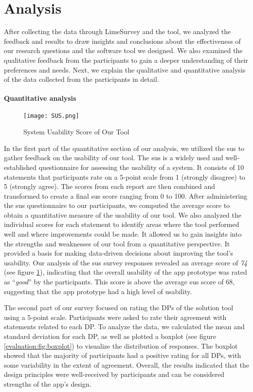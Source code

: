 \clearpage
\section{Analysis}
\label{evaluation:section:analysis}
After collecting the data through LimeSurvey and the tool, we analyzed the feedback and results to draw insights and conclusions about the effectiveness of our research questions and the software tool we designed. 
We also examined the qualitative feedback from the participants to gain a deeper understanding of their preferences and needs. 
Next, we explain the qualitative and quantitative analysis of the data collected from the participants in detail.

\paragraph{Quantitative analysis}
\begin{figure}[ht]
    \centering
    \texttt{[image: SUS.png]}
    \caption{System Usability Score of Our Tool}
    \label{evaluation:fig:sus}
\end{figure}
In the first part of the quantitative section of our analysis, we utilized the \ac{sus} to gather feedback on the usability of our tool. 
The \ac{sus} is a widely used and well-established questionnaire for assessing the usability of a system. 
It consists of 10 statements that participants rate on a 5-point scale from 1 (strongly disagree) to 5 (strongly agree). 
The scores from each report are then combined and transformed to create a final \ac{sus} score ranging from 0 to 100.
After administering the \ac{sus} questionnaire to our participants, we computed the average score to obtain a quantitative measure of the usability of our tool. 
We also analyzed the individual scores for each statement to identify areas where the tool performed well and where improvements could be made. 
It allowed us to gain insights into the strengths and weaknesses of our tool from a quantitative perspective. 
It provided a basis for making data-driven decisions about improving the tool's usability. 
Our analysis of the \ac{sus} survey responses revealed an average score of \textit{74} (see figure \ref{evaluation:fig:sus}), indicating that the overall usability of the app prototype was rated as ``\textit{good}'' by the participants.
This score is above the average \ac{sus} score of 68, suggesting that the app prototype had a high level of usability.

The second part of our survey focused on rating the DPs of the solution tool using a 5-point scale. 
Participants were asked to rate their agreement with statements related to each DP. 
To analyze the data, we calculated the mean and standard deviation for each DP, as well as plotted a boxplot (see figure \ref{evaluation:fig:boxplot}) to visualize the distribution of responses. 
The boxplot showed that the majority of participants had a positive rating for all DPs, with some variability in the extent of agreement. 
Overall, the results indicated that the design principles were well-received by participants and can be considered strengths of the app's design.

